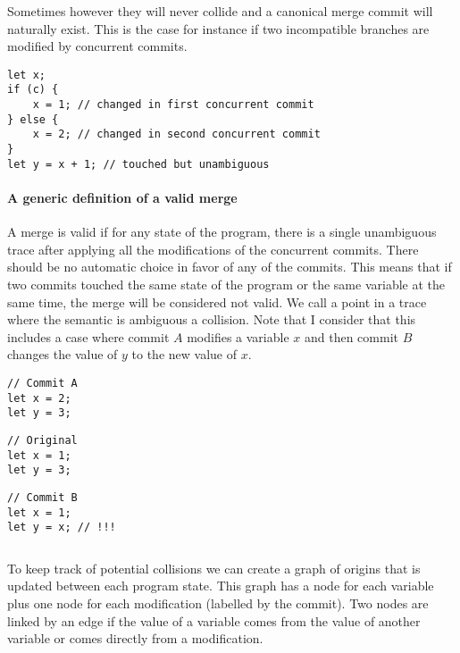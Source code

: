 \documentclass[a4paper,10pt]{article}
\begin{document}
Sometimes however they will never collide and a canonical merge commit will naturally exist. This is the case for instance if two incompatible branches are modified by concurrent commits.
\begin{lstlisting}[caption=Merged version of two compatible concurrent commits modifying $x$]
let x;
if (c) {
    x = 1; // changed in first concurrent commit
} else {
    x = 2; // changed in second concurrent commit
}
let y = x + 1; // touched but unambiguous
\end{lstlisting}

\paragraph{A generic definition of a valid merge} A merge is valid if for any state of the program, there is a single unambiguous trace after applying all the modifications of the concurrent commits. There should be no automatic choice in favor of any of the commits. This means that if two commits touched the same state of the program or the same variable at the same time, the merge will be considered not valid. We call a point in a trace where the semantic is ambiguous a collision.
Note that I consider that this includes a case where commit $A$ modifies a variable $x$ and then commit $B$ changes the value of $y$ to the new value of $x$.

\noindent
\begin{minipage}{.32\textwidth}
\begin{lstlisting}
// Commit A
let x = 2;
let y = 3;
\end{lstlisting}
\end{minipage}\hfill
\begin{minipage}{.32\textwidth}
\begin{lstlisting}
// Original
let x = 1;
let y = 3;
\end{lstlisting}
\end{minipage}\hfill
\begin{minipage}{.32\textwidth}
\begin{lstlisting}
// Commit B
let x = 1;
let y = x; // !!!
\end{lstlisting}
\end{minipage}
\vspace{-.4cm}
\begin{lstlisting}[caption=Colliding changes by using a variable modified by someone else]
\end{lstlisting}

To keep track of potential collisions we can create a graph of origins that is updated between each program state. This graph has a node for each variable plus one node for each modification (labelled by the commit). Two nodes are linked by an edge if the value of a variable comes from the value of another variable or comes directly from a modification.
\end{document}
